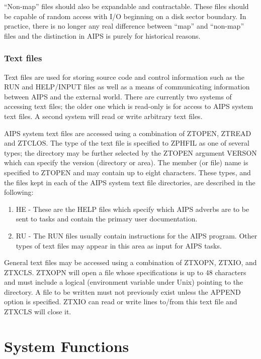 ``Non-map'' files should also be expandable and contractable. These files
should be capable of random access with I/O beginning on a disk sector
boundary.  In practice, there is no longer any real difference between
``map'' and ``non-map'' files and the distinction in AIPS is purely
for historical reasons.

\subsubsection{Text files }
Text files are used for storing source code and control
information such as the RUN and HELP/INPUT files as well as a means of
communicating information between AIPS and the external world.
There are currently two systems of accessing text files; the older one
which is read-only is for access to AIPS system text files.  A second
system will read or write arbitrary text files.

AIPS system text files are accessed using a combination of
ZTOPEN, ZTREAD and ZTCLOS.
The type of the text file is specified to ZPHFIL as one
of several types; the directory may be further selected by the ZTOPEN
argument VERSON which can specify the version (directory or area). The
member (or file) name is specified to ZTOPEN and may contain up to
eight characters. These types, and the files kept in each of the AIPS
system text file directories, are described in the following:
\begin{enumerate} %
\item HE - These are the HELP files which specify which AIPS adverbs are to
be sent to tasks and contain the primary user documentation.
\item RU - The RUN files usually contain instructions for the AIPS program.
Other types of text files may appear in this area as input for AIPS
tasks.

\end{enumerate} %

   General text files may be accessed using a combination of
ZTXOPN, ZTXIO, and ZTXCLS.
ZTXOPN will open a file whose specifications is up to 48 characters
and must include a logical (environment variable under Unix) pointing
to the directory.  A file to be written must not previously exist
unless the APPEND option is specified.  ZTXIO can read or write lines
to/from this text file and ZTXCLS will close it.

\section{System Functions }

